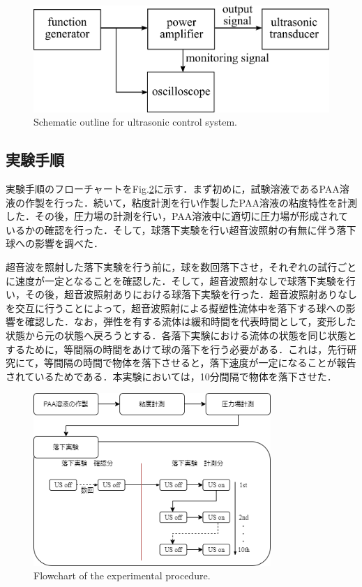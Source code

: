 \begin{figure}[h]
    \centering
    \includegraphics[clip,width=15.0cm]{2-Methods/connect-with-signal.png}
    \caption{Schematic outline for ultrasonic control system.}
    \label{fig:connect-with-signal}
\end{figure}

\newpage

\subsection{実験手順}

実験手順のフローチャートをFig.\ref{fig:exp-methods}に示す．まず初めに，試験溶液であるPAA溶液の作製を行った．続いて，粘度計測を行い作製したPAA溶液の粘度特性を計測した．その後，圧力場の計測を行い，PAA溶液中に適切に圧力場が形成されているかの確認を行った．そして，球落下実験を行い超音波照射の有無に伴う落下球への影響を調べた．

超音波を照射した落下実験を行う前に，球を数回落下させ，それぞれの試行ごとに速度が一定となることを確認した．そして，超音波照射なしで球落下実験を行い，その後，超音波照射ありにおける球落下実験を行った．超音波照射ありなしを交互に行うことによって，超音波照射による擬塑性流体中を落下する球への影響を確認した．なお，弾性を有する流体は緩和時間を代表時間として，変形した状態から元の状態へ戻ろうとする．各落下実験における流体の状態を同じ状態とするために，等間隔の時間をあけて球の落下を行う必要がある．これは，先行研究\cite{ref:8-5}にて，等間隔の時間で物体を落下させると，落下速度が一定になることが報告されているためである．本実験においては，10分間隔で物体を落下させた．

\begin{figure}[ht]
    \centering
    \includegraphics[clip,width=9.0cm]{2-Methods/exp-methods.png}
    \caption{Flowchart of the experimental procedure.}
    \label{fig:exp-methods}
\end{figure}
